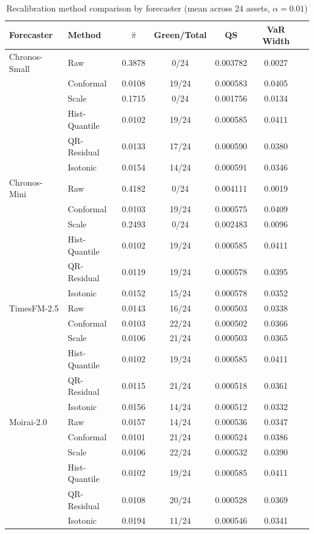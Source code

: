 \begin{table}[H]
\centering
\caption{Recalibration method comparison by forecaster (mean across 24 assets, $\alpha = 0.01$)}
\label{tab:baselines_by_model}
\footnotesize
\begin{tabular}{llccccc}
\toprule
Forecaster & Method & $\hat{\pi}$ & Green/Total & QS & VaR Width \\
\midrule
Chronos-Small & Raw & 0.3878 & 0/24 & 0.003782 & 0.0027 \\
 & Conformal & 0.0108 & 19/24 & 0.000583 & 0.0405 \\
 & Scale & 0.1715 & 0/24 & 0.001756 & 0.0134 \\
 & Hist-Quantile & 0.0102 & 19/24 & 0.000585 & 0.0411 \\
 & QR-Residual & 0.0133 & 17/24 & 0.000590 & 0.0380 \\
 & Isotonic & 0.0154 & 14/24 & 0.000591 & 0.0346 \\
\midrule
Chronos-Mini & Raw & 0.4182 & 0/24 & 0.004111 & 0.0019 \\
 & Conformal & 0.0103 & 19/24 & 0.000575 & 0.0409 \\
 & Scale & 0.2493 & 0/24 & 0.002483 & 0.0096 \\
 & Hist-Quantile & 0.0102 & 19/24 & 0.000585 & 0.0411 \\
 & QR-Residual & 0.0119 & 19/24 & 0.000578 & 0.0395 \\
 & Isotonic & 0.0152 & 15/24 & 0.000578 & 0.0352 \\
\midrule
TimesFM-2.5 & Raw & 0.0143 & 16/24 & 0.000503 & 0.0338 \\
 & Conformal & 0.0103 & 22/24 & 0.000502 & 0.0366 \\
 & Scale & 0.0106 & 21/24 & 0.000503 & 0.0365 \\
 & Hist-Quantile & 0.0102 & 19/24 & 0.000585 & 0.0411 \\
 & QR-Residual & 0.0115 & 21/24 & 0.000518 & 0.0361 \\
 & Isotonic & 0.0156 & 14/24 & 0.000512 & 0.0332 \\
\midrule
Moirai-2.0 & Raw & 0.0157 & 14/24 & 0.000536 & 0.0347 \\
 & Conformal & 0.0101 & 21/24 & 0.000524 & 0.0386 \\
 & Scale & 0.0106 & 22/24 & 0.000532 & 0.0390 \\
 & Hist-Quantile & 0.0102 & 19/24 & 0.000585 & 0.0411 \\
 & QR-Residual & 0.0108 & 20/24 & 0.000528 & 0.0369 \\
 & Isotonic & 0.0194 & 11/24 & 0.000546 & 0.0341 \\

\end{tabular}
\end{table}
